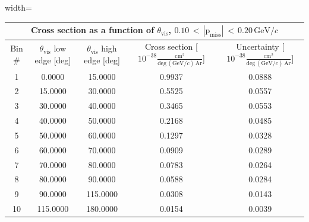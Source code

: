 \begin{table}[H]
\raggedright
\begin{adjustbox}{width=\textwidth}
\small
\begin{tabular}{ |c|c|c|c|c| }
\hline
\multicolumn{5}{|c|}{Cross section as a function of $\theta_{\mathrm{vis}}$, $\mathrm{0.10\,<\,|p_{miss}|\,<\,0.20\,GeV/\textit{c}}$} \\
\hline
\hline
Bin \# & $\theta_{\mathrm{vis}}$ low edge [deg] & $\theta_{\mathrm{vis}}$ high edge [deg] & Cross section [$10^{-38}\mathrm{\frac{cm^{2}}{deg\,(GeV/\textit{c})\,Ar}}$] & Uncertainty [$10^{-38}\mathrm{\frac{cm^{2}}{deg\,(GeV/\textit{c})\,Ar}}$] \\
\hline
\hline
1 & 0.0000 & 15.0000 & 0.9937 & 0.0888\\
2 & 15.0000 & 30.0000 & 0.5525 & 0.0557\\
3 & 30.0000 & 40.0000 & 0.3465 & 0.0553\\
4 & 40.0000 & 50.0000 & 0.2168 & 0.0485\\
5 & 50.0000 & 60.0000 & 0.1297 & 0.0328\\
6 & 60.0000 & 70.0000 & 0.0909 & 0.0289\\
7 & 70.0000 & 80.0000 & 0.0783 & 0.0264\\
8 & 80.0000 & 90.0000 & 0.0588 & 0.0284\\
9 & 90.0000 & 115.0000 & 0.0308 & 0.0143\\
10 & 115.0000 & 180.0000 & 0.0154 & 0.0039\\
\hline
\end{tabular}
\end{adjustbox}
\end{table}


